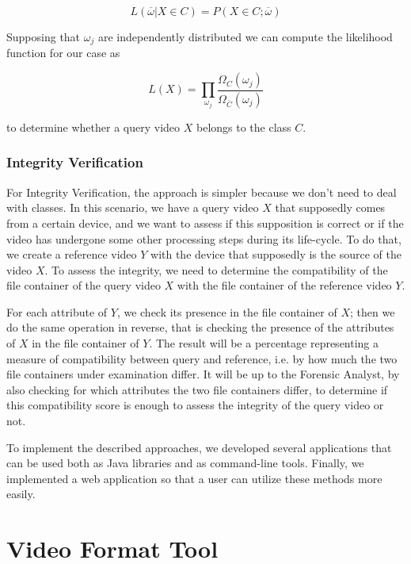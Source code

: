 $$ L(\overline{\omega} | X \in C) = P(X \in C; \overline{\omega}) $$

Supposing that $\omega_{j}$ are independently distributed we can compute the likelihood function for our case as

\begin{equation}\label{eq:likelihood}
L(X) = \prod\limits_{\omega_{j}}\dfrac{\Omega_{C}(\omega_{j}) }{\Omega_{\overline{C}}(\omega_{j})}
\end{equation}

to determine whether a query video $X$ belongs to the class $C$.

\subsubsection*{Integrity Verification}

For Integrity Verification, the approach is simpler because we don't need to deal with classes. In this scenario, we have a query video $X$ that supposedly comes from a certain device, and we want to assess if this supposition is correct or if the video has undergone some other processing steps during its life-cycle. To do that, we create a reference video $Y$ with the device that supposedly is the source of the video $X$. To assess the integrity, we need to determine the compatibility of the file container of the query video $X$ with the file container of the reference video $Y$. 

For each attribute of $Y$, we check its presence in the file container of $X$; then we do the same operation in reverse, that is checking the presence of the attributes of $X$ in the file container of $Y$. The result will be a percentage representing a measure of compatibility between query and reference, i.e. by how much the two file containers under examination differ. It will be up to the Forensic Analyst, by also checking for which attributes the two file containers differ, to determine if this compatibility score is enough to assess the integrity of the query video or not. \newline

To implement the described approaches, we developed several applications that can be used both as Java libraries and as command-line tools. Finally, we implemented a web application so that a user can utilize these methods more easily.

\section{Video Format Tool}

